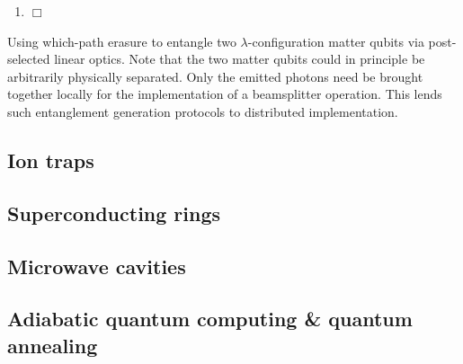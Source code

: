 \begin{table}[!htb]
{{{\begin{enumerate}
\begin{align}
\ket\psi_\text{out}^{0,1} = \bra{0,1}_{A_2,B_2} \ket\psi_\text{BS} = \frac{1}{2} (\ket{\!\uparrow,\downarrow}_{A_1,B_1} - \ket{\!\downarrow,\uparrow}_{A_1,B_1}),
\end{align}
which is a Bell-pair between the matter qubits.
    \item $\Box$
\end{enumerate}}}}
\caption{Using which-path erasure to entangle two $\lambda$-configuration matter qubits via post-selected linear optics. Note that the two matter qubits could in principle be arbitrarily physically separated. Only the emitted photons need be brought together locally for the implementation of a beamsplitter operation. This lends such entanglement generation protocols to distributed implementation.} \label{alg:which_path}
\end{table}

%
%

\subsection{Ion traps}


%
%

\subsection{Superconducting rings}


%
%

\subsection{Microwave cavities}


%
%

\subsection{Adiabatic quantum computing \& quantum annealing}

